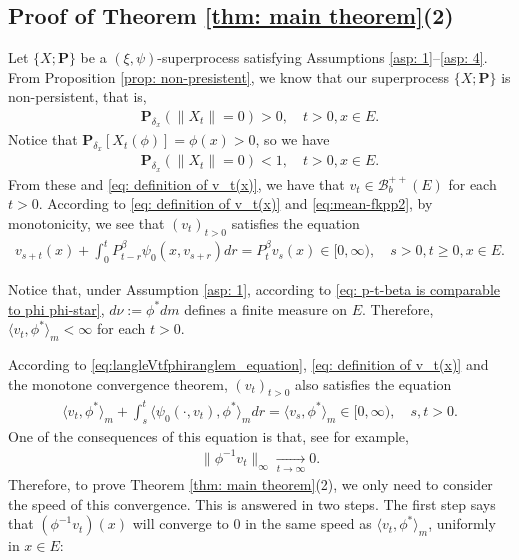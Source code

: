 \documentclass[UTF8]{pkuthss}
\theoremstyle{plain}
\theoremstyle{definition}
\numberwithin{equation}{section}
\begin{document}
\subsection{Proof of Theorem \ref{thm: main theorem}(2)}
\label{sec: proof of result 2}
	Let $\{X; \mathbf P\}$ be a $(\xi, \psi)$-superprocess satisfying
	Assumptions \ref{asp: 1}--\ref{asp: 4}.
	From Proposition \ref{prop: non-presistent}, we know that our superprocess $\{X;\mathbf P\}$ is non-persistent, that is,
\begin{align}
    \mathbf P_{\delta_x}(\|X_t\| = 0)
    > 0,
    \quad t>0, x \in E.
\end{align}
	Notice that $\mathbf P_{\delta_x}[X_t(\phi)] = \phi(x)>0$, so we have
\begin{align}
    \mathbf P_{\delta_x}(\|X_t\|= 0)<1,
    \quad t>0, x \in E.
\end{align}
	From these and \eqref{eq: definition of v_t(x)}, we have that $v_t \in \mathscr B^{++}_b(E)$ for each $t > 0$.
	According to \eqref{eq: definition of v_t(x)} and \eqref{eq:mean-fkpp2}, by monotonicity,
	we see that $(v_t)_{t > 0}$ satisfies the equation
\begin{align}
	v_{s+t}(x) + \int_0^t P^\beta_{t-r} \psi_0(x,v_{s+r}) dr
	= P^\beta_t v_s(x)
	\in [0,\infty),
	\quad s>0, t \geq 0,x \in E.
\end{align}

	Notice that, under Assumption \ref{asp: 1}, according to \eqref{eq: p-t-beta is comparable to phi phi-star}, $d\nu:= \phi^* dm$ defines a finite measure on $E$.
	Therefore, $\langle v_t, \phi^*\rangle_m < \infty$ for each $t>0$.

	According to \eqref{eq:langleVtfphiranglem_equation}, \eqref{eq: definition of v_t(x)} and the monotone convergence theorem,
	$(v_t)_{t> 0}$ also satisfies the equation
\begin{align} \label{eq: equation of <vt,phi>}
	\langle v_t,\phi^*\rangle_m + \int_s^t \langle \psi_0(\cdot ,v_t) , \phi^*\rangle_m dr
	= \langle v_s,\phi^*\rangle_m
	\in [0,\infty),
	\quad s, t > 0.
\end{align}
	One of the consequences of this equation is that, see \cite[Lemma 5.1]{RenSongSun2017Spine} for example,
\begin{align} \label{eq: uniform converges to 0}
    \|\phi^{-1}v_t\|_{\infty} \xrightarrow[t\to \infty]{} 0.
\end{align}
	Therefore, to prove Theorem \ref{thm: main theorem}(2), we only need to consider the speed of this convergence.
	This is answered in two steps.
	The first step says that $(\phi^{-1}v_t)(x)$ will converge to $0$ in the same speed as $\langle v_t,\phi^*\rangle_m $, uniformly in $x\in E$:
\end{document}
